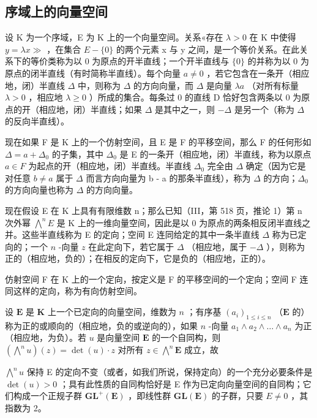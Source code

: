 \subsection{序域上的向量空间}

设 K 为一个序域，E 为 K 上的一个向量空间。关系«存在 \(\lambda > 0\) 在 K 中使得 \(y = \lambda x \gg\) ，在集合 \(E - \{0\}\) 的两个元素 x 与 y 之间，是一个等价关系。在此关系下的等价类称为以 0 为原点的开半直线；一个开半直线与 \(\{0\}\) 的并称为以 0 为原点的闭半直线（有时简称半直线）。每个向量 \(a \neq 0\) ，若它包含在一条开（相应地，闭）半直线 \(\Delta\) 中，则称为 \(\Delta\) 的方向向量，而 \(\Delta\) 是向量 \(\lambda a\) （对所有标量 \(\lambda > 0\) ，相应地 \(\lambda \geqslant 0\) ）所成的集合。每条过 0 的直线 D 恰好包含两条以 0 为原点的开（相应地，闭）半直线；如果 \(\Delta\) 是其中之一，则 \(-\Delta\) 是另一个（称为 \(\Delta\) 的反向半直线）。

现在如果 F 是 K 上的一个仿射空间，且 E 是 F 的平移空间，那么 F 的任何形如 \(\Delta = a + \Delta_{0}\) 的子集，其中 \(\Delta_{0}\) 是 E 的一条开（相应地，闭）半直线，称为以原点 \(a \in F\) 为起点的开（相应地，闭）半直线。半直线 \(\Delta_{0}\) 完全由 \(\Delta\) 确定（因为它是对任意 \(b \neq a\) 属于 \(\Delta\) 而言方向向量为 b - a 的那条半直线），称为 \(\Delta\) 的方向；\(\Delta_{0}\) 的方向向量也称为 \(\Delta\) 的方向向量。

现在假设 E 在 K 上具有有限维数 n；那么已知（III，第 518 页，推论 1）第 n 次外幂 \(\bigwedge^{n}E\) 是 K 上的一维向量空间，因此是以 0 为原点的两条相反闭半直线之并。这些半直线称为 E 的定向；空间 E 连同给定的其中一条半直线 \(\Delta\) 称为已定向的；一个 \(n\) -向量 \(z\) 在此定向下，若它属于 \(\Delta\) （相应地，属于 \(-\Delta\) ），则称为正的（相应地，负的）；在相反的定向下，它是负的（相应地，正的）。

仿射空间 F 在 K 上的一个定向，按定义是 F 的平移空间的一个定向；空间 F 连同这样的定向，称为有向仿射空间。

设 \(\mathbf{E}\) 是 \(\mathbf{K}\) 上一个已定向的向量空间，维数为 \(n\) ；有序基 \((a_i)_{1 \leqslant i \leqslant n}\) （\(\mathbf{E}\) 的）称为正的或顺向的（相应地，负的或逆向的），如果 \(n\) -向量 \(a_1 \wedge a_2 \wedge \ldots \wedge a_n\) 为正（相应地，为负）。若 \(u\) 是向量空间 \(\mathbf{E}\) 的一个自同构，则 \((\bigwedge^{n} u)(z) = \det(u) \cdot z\) 对所有 \(z \in \bigwedge^{n} \mathbf{E}\) 成立，故

\(\bigwedge^{n} u\) 保持 E 的定向不变（或者，如我们所说，保持定向）的一个充分必要条件是 \(\det(u) > 0\) ；具有此性质的自同构恰好是 E 作为已定向向量空间的自同构；它们构成一个正规子群 \(\mathbf{GL}^{+}(\mathbf{E})\) ，即线性群 \(\mathbf{GL}(\mathbf{E})\) 的子群，只要 \(E \neq 0\) ，其指数为 2。

